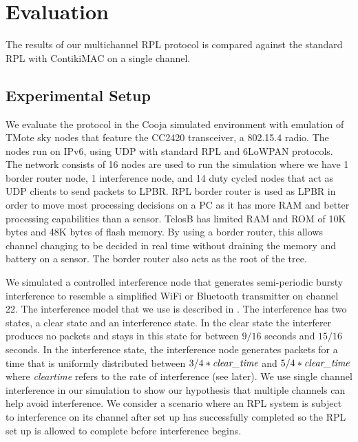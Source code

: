 \section{Evaluation}
\label{sec:evaluation}
The results of our multichannel RPL protocol is compared against the standard RPL with ContikiMAC on a single channel.

\subsection{Experimental Setup}
We evaluate the protocol in the  Cooja simulated environment with emulation of TMote sky nodes that feature the CC2420 transceiver, a 802.15.4 radio. The nodes run on IPv6, using UDP with standard RPL and 6LoWPAN protocols. The network consists of 16 nodes are used to run the simulation where we have 1 border router node, 1 interference node, and 14 duty cycled nodes that act as UDP clients to send packets to LPBR. RPL border router is used as LPBR in order to move most processing decisions on a PC as it has more RAM and better processing capabilities than a sensor. TelosB has limited RAM and ROM of 10K bytes and 48K bytes of flash memory. By using a border router, this allows channel changing to be decided in real time without draining the memory and battery on a sensor. The border router also acts as the root of the tree.

We simulated a controlled interference node that generates semi-periodic bursty interference to resemble a simplified WiFi or Bluetooth transmitter on channel 22. The interference model that we use is described in \cite{Boano:2010:MSM:2127940.2127963}. The interference has two states, a clear state and an interference state. In the clear state the interferer produces no packets and stays in this state for between $9/16$ seconds and $15/16$ seconds. In the interference state, the interference node generates packets for a time that is uniformly distributed between $3/4 * \emph{clear\textunderscore time}$ and $5/4 * \emph{clear\textunderscore time}$ where \emph{clear\textunderscore time} refers to the rate of interference (see later). We use single channel interference in our simulation to show our hypothesis that multiple channels can help avoid interference.  We consider a scenario where an RPL system is subject to interference on its channel after set up has successfully completed so the RPL set up is allowed to complete before
interference begins.

